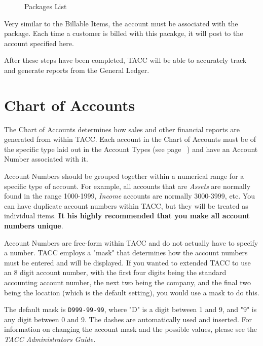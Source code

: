 \begin{enumerate}
\begin{figure}[hbtp]
\caption{ \label{fig:PackagesList} Packages List}
\end{figure}
Very similar to the Billable Items, the account must be associated with
the package.  Each time a customer is billed with this pacakge, it will
post to the account specified here.
\end{enumerate}
After these steps have been completed, TACC will be able to accurately
track and generate reports from the General Ledger.

\section{Chart of Accounts}
\label{Chart of Accounts}
The Chart of Accounts determines how sales and other financial reports
are generated from within TACC.  Each account in the Chart of Accounts
must be of the specific type laid out in the Account Types (see page
~\pageref{QuickStartAccountTypes}) and have an Account Number associated
with it.

Account Numbers should be grouped together within a numerical range for
a specific type of account.  For example, all accounts that are
\emph{Assets} are normally found in the range 1000-1999, \emph{Income}
accounts are normally 3000-3999, etc.  You can have duplicate account
numbers within TACC, but they will be treated as individual items.
{\bf It his highly recommended that you make all account numbers unique}.

Account Numbers are free-form within TACC and do not actually have to
specify a number.  TACC employs a "mask" that determines how the account
numbers must be entered and will be displayed.  If you wanted to
extended TACC to use an 8 digit account number, with the first four
digits being the standard accounting account number, the next two being
the company, and the final two being the location (which is the default
setting), you would use a mask to do this.

The default mask is {\tt D999-99-99}, where "D" is a digit between 1 and 9,
and "9" is any digit between 0 and 9.  The dashes are automatically used
and inserted.  For information on changing the account mask and the
possible values, please see the \it{TACC Administrators Guide}.

